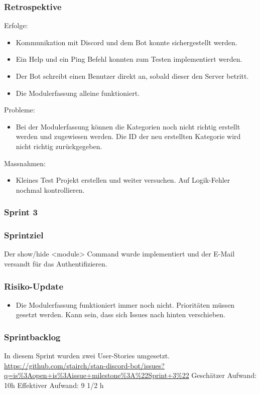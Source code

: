 \documentclass[a4paper, table]{article}
\begin{document}
\subsubsection*{Retrospektive}
Erfolge:
\begin{itemize}
    \item Kommunikation mit Discord und dem Bot konnte sichergestellt werden.
    \item Ein Help und ein Ping Befehl konnten zum Testen implementiert werden.
    \item Der Bot schreibt einen Benutzer direkt an, sobald dieser den Server betritt.
    \item Die Modulerfassung alleine funktioniert.
\end{itemize}
Probleme:
\begin{itemize}
    \item Bei der Modulerfassung können die Kategorien noch nicht richtig erstellt werden und zugewiesen werden.
    Die ID der neu erstellten Kategorie wird nicht richtig zurückgegeben.
\end{itemize}
Massnahmen:
\begin{itemize}
    \item Kleines Test Projekt erstellen und weiter versuchen. Auf Logik-Fehler nochmal kontrollieren.
\end{itemize}
\newpage

\subsubsection{Sprint 3}
\subsubsection*{Sprintziel}
Der show/hide <module> Command wurde implementiert und der E-Mail versandt für das Authentifizieren.

\subsubsection*{Risiko-Update}
\begin{itemize}
    \item Die Modulerfassung funktioniert immer noch nicht.
    Prioritäten müssen gesetzt werden.
    Kann sein, dass sich Issues nach hinten verschieben.
\end{itemize}

\subsubsection*{Sprintbacklog}
In diesem Sprint wurden zwei User-Stories umgesetzt.\\
\url{https://github.com/stairch/stan-discord-bot/issues?q=is%3Aopen+is%3Aissue+milestone%3A%22Sprint+3%22}
\newline
Geschätzer Aufwand: 10h
\newline
Effektiver Aufwand: 9 1/2 h
\end{document}
